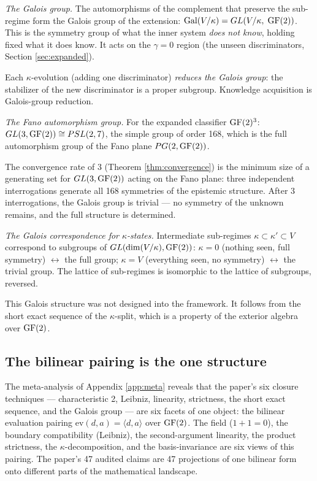 \emph{The Galois group.}
The automorphisms of the complement that preserve the
sub-regime form the Galois group of the extension:
$\mathrm{Gal}(V/\kappa) = GL(V/\kappa,\; \operatorname{GF}(2))$.
This is the symmetry group of what the inner system
\emph{does not know}, holding fixed what it does know.
It acts on the $\gamma = 0$ region (the unseen
discriminators, Section \ref{sec:expanded}).

Each $\kappa$-evolution (adding one discriminator)
\emph{reduces the Galois group}: the stabilizer of the
new discriminator is a proper subgroup. Knowledge
acquisition is Galois-group reduction.

\emph{The Fano automorphism group.}
For the expanded classifier $\operatorname{GF}(2)^3$:
$GL(3, \operatorname{GF}(2)) \cong PSL(2,7)$, the simple group of
order 168, which is the full automorphism group of the
Fano plane $PG(2, \operatorname{GF}(2))$.

The convergence rate of 3 (Theorem \ref{thm:convergence})
is the minimum size of a generating set for $GL(3, \operatorname{GF}(2))$
acting on the Fano plane: three independent interrogations
generate all 168 symmetries of the epistemic structure.
After 3 interrogations, the Galois group is trivial ---
no symmetry of the unknown remains, and the full
structure is determined.

\emph{The Galois correspondence for $\kappa$-states.}
Intermediate sub-regimes $\kappa \subset \kappa' \subset V$
correspond to subgroups of $GL(\dim(V/\kappa), \operatorname{GF}(2))$:
$\kappa = 0$ (nothing seen, full symmetry) $\leftrightarrow$
the full group;
$\kappa = V$ (everything seen, no symmetry)
$\leftrightarrow$ the trivial group. The lattice of
sub-regimes is isomorphic to the lattice of subgroups,
reversed.

This Galois structure was not designed into the
framework. It follows from the short exact sequence of
the $\kappa$-split, which is a property of the exterior
algebra over $\operatorname{GF}(2)$.

\subsection{The bilinear pairing is the one structure}
\label{sec:one-structure}

The meta-analysis of Appendix \ref{app:meta} reveals
that the paper's six closure techniques ---
characteristic 2, Leibniz, linearity, strictness,
the short exact sequence, and the Galois group ---
are six facets of one object: the bilinear evaluation
pairing $\mathrm{ev}(d, a) = \langle d, a \rangle$
over $\operatorname{GF}(2)$. The field ($1{+}1{=}0$), the boundary
compatibility (Leibniz), the second-argument linearity,
the product strictness, the $\kappa$-decomposition,
and the basis-invariance are six views of this pairing.
The paper's 47 audited claims are 47 projections of
one bilinear form onto different parts of the
mathematical landscape.

